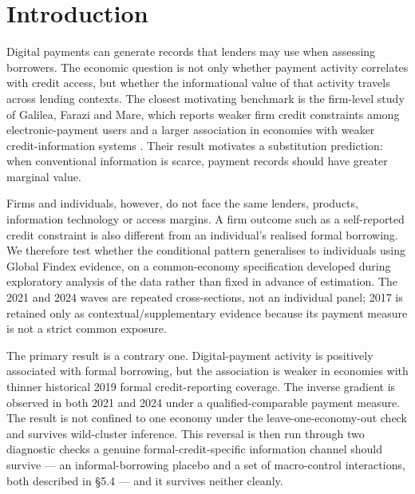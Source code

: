 \section{Introduction}

Digital payments can generate records that lenders may use when assessing borrowers. The
economic question is not only whether payment activity correlates with credit access, but
whether the informational value of that activity travels across lending contexts. The
closest motivating benchmark is the firm-level study of Galilea, Farazi and Mare, which
reports weaker firm credit constraints among electronic-payment users and a larger
association in economies with weaker credit-information systems
\citep{GalileaFaraziMare2026}. Their result motivates a substitution prediction: when
conventional information is scarce, payment records should have greater marginal value.

Firms and individuals, however, do not face the same lenders, products, information
technology or access margins. A firm outcome such as a self-reported credit constraint is
also different from an individual's realised formal borrowing. We therefore test whether
the conditional pattern generalises to individuals using Global Findex evidence, on a
common-economy specification developed during exploratory analysis of the data rather
than fixed in advance of estimation. The 2021 and 2024 waves are repeated cross-sections, not an individual panel;
2017 is retained only as contextual/supplementary evidence because its payment measure is
not a strict common exposure.

The primary result is a contrary one. Digital-payment activity is positively associated
with formal borrowing, but the association is weaker in economies with thinner historical
2019 formal credit-reporting coverage. The inverse gradient is observed in both 2021 and
2024 under a qualified-comparable payment measure. The result is not confined to one
economy under the leave-one-economy-out check and survives wild-cluster inference. This
reversal is then run through two diagnostic checks a genuine formal-credit-specific
information channel should survive --- an informal-borrowing placebo and a set of
macro-control interactions, both described in \S5.4 --- and it survives neither cleanly.

